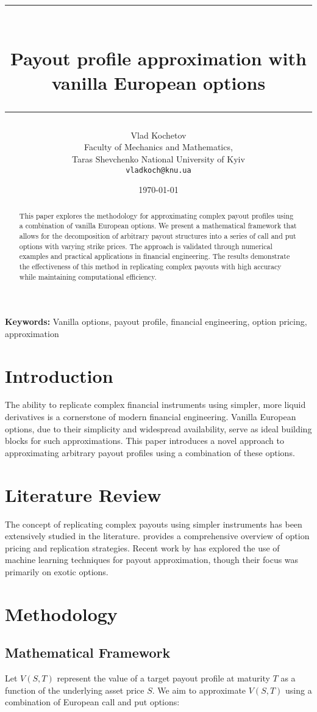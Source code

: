 \documentclass[12pt]{article}
\title{\rule{\textwidth}{1pt}\\[0.5cm]
Payout profile approximation with vanilla European options\\[0.5cm]
\rule{\textwidth}{1pt}}
\author{\small Vlad Kochetov \\ \small Faculty of Mechanics and Mathematics, \\ \small Taras Shevchenko National University of Kyiv \\ \small \texttt{vladkoch@knu.ua}}
\date{\today}
\providecommand{\keywords}[1]{\textbf{Keywords:} #1}
\begin{document}
\maketitle

\begin{abstract}
This paper explores the methodology for approximating complex payout profiles using a combination of vanilla European options. We present a mathematical framework that allows for the decomposition of arbitrary payout structures into a series of call and put options with varying strike prices. The approach is validated through numerical examples and practical applications in financial engineering. The results demonstrate the effectiveness of this method in replicating complex payouts with high accuracy while maintaining computational efficiency.
\end{abstract}

\keywords{Vanilla options, payout profile, financial engineering, option pricing, approximation}

\section{Introduction}
The ability to replicate complex financial instruments using simpler, more liquid derivatives is a cornerstone of modern financial engineering. Vanilla European options, due to their simplicity and widespread availability, serve as ideal building blocks for such approximations. This paper introduces a novel approach to approximating arbitrary payout profiles using a combination of these options.

\section{Literature Review}
The concept of replicating complex payouts using simpler instruments has been extensively studied in the literature. \cite{hull2018options} provides a comprehensive overview of option pricing and replication strategies. Recent work by \cite{smith2020financial} has explored the use of machine learning techniques for payout approximation, though their focus was primarily on exotic options.

\section{Methodology}
\subsection{Mathematical Framework}
Let \( V(S, T) \) represent the value of a target payout profile at maturity \( T \) as a function of the underlying asset price \( S \). We aim to approximate \( V(S, T) \) using a combination of European call and put options:
\end{document}
